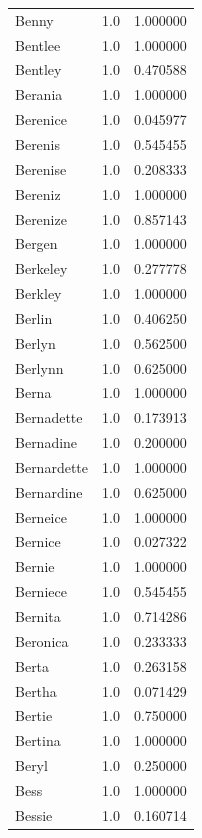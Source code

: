 \documentclass[
  letterpaper,
  DIV=11,
  numbers=noendperiod]{scrreprt}
\begin{document}
\begin{tabular}{lrr}
Benny           &   1.0 &   1.000000 \\
Bentlee         &   1.0 &   1.000000 \\
Bentley         &   1.0 &   0.470588 \\
Berania         &   1.0 &   1.000000 \\
Berenice        &   1.0 &   0.045977 \\
Berenis         &   1.0 &   0.545455 \\
Berenise        &   1.0 &   0.208333 \\
Bereniz         &   1.0 &   1.000000 \\
Berenize        &   1.0 &   0.857143 \\
Bergen          &   1.0 &   1.000000 \\
Berkeley        &   1.0 &   0.277778 \\
Berkley         &   1.0 &   1.000000 \\
Berlin          &   1.0 &   0.406250 \\
Berlyn          &   1.0 &   0.562500 \\
Berlynn         &   1.0 &   0.625000 \\
Berna           &   1.0 &   1.000000 \\
Bernadette      &   1.0 &   0.173913 \\
Bernadine       &   1.0 &   0.200000 \\
Bernardette     &   1.0 &   1.000000 \\
Bernardine      &   1.0 &   0.625000 \\
Berneice        &   1.0 &   1.000000 \\
Bernice         &   1.0 &   0.027322 \\
Bernie          &   1.0 &   1.000000 \\
Berniece        &   1.0 &   0.545455 \\
Bernita         &   1.0 &   0.714286 \\
Beronica        &   1.0 &   0.233333 \\
Berta           &   1.0 &   0.263158 \\
Bertha          &   1.0 &   0.071429 \\
Bertie          &   1.0 &   0.750000 \\
Bertina         &   1.0 &   1.000000 \\
Beryl           &   1.0 &   0.250000 \\
Bess            &   1.0 &   1.000000 \\
Bessie          &   1.0 &   0.160714 \\

\end{tabular}
\end{document}
